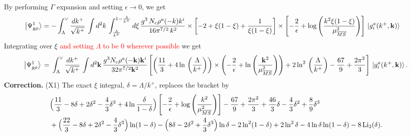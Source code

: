 \documentclass[10pt]{article}
\numberwithin{equation}{section}
\begin{document}
By performing $\Gamma$ expansion and setting $\epsilon \rightarrow 0$, we get
\begin{align}
     \left|\Psi_{g\rho}^{1}\right\rangle & = - \int_{\Lambda}^{\vee} \frac{dk^{+}}{\sqrt{k^{+}}} \,\int d^{2}k\, \int_{\frac{\Lambda}{k^{+}}}^{1-\frac{\Lambda}{k^{+}}} d\xi\, \frac{g^{3}\,N_{c}\rho^{a}(-k) k^{i}}{16\pi^{7/2}\,k^{2}}\times \left[-2+\xi(1-\xi)+\frac{1}{\xi(1-\xi)}\right]\times \left[-\frac{2}{\epsilon}+\log{\left(\frac{k^{2}\xi(1-\xi)}{\mu^{2}_{\overline{MS}}}\right)}\right]\, \ket{g^{a}_{i}(k^{+},\mathbf{k})}
\end{align}
Integrating over $\xi$ \textcolor{red}{and setting $\Lambda$ to be $0$ wherever possible} we get\\
\begin{align}\label{gtwoloop1}
\left|\Psi_{g\rho}^{1}\right\rangle\,=\,\int_{\Lambda}^{\vee}\frac{dk^{+}}{\sqrt{k^{+}}}\,\int d^{2}\mathbf{k}\,\frac{g^{3}N_{c}\rho^{a}(-\mathbf{k})\mathbf{k}^{i}}{32\pi^{7/2}\mathbf{k}^{2}}
\left[\left(\frac{11}{3}+4\ln\,\left(\frac{\Lambda}{k^{+}}\right)\right)\times\left(-\frac{2}{\epsilon}+\ln\left(\frac{\mathbf{k}^{2}}{\mu_{\overline{MS}}^{2}}\right)\right)+2\ln^{2}\,\left(\frac{\Lambda}{k^{+}}\right)-\frac{67}{9}+\frac{2\pi^{2}}{3}\right]\, \ket{g^{a}_{i}(k^{+},\mathbf{k})}.
\end{align}
{\color{blue}\noindent\textbf{Correction.} (X1) The exact $\xi$ integral, $\delta=\Lambda/k^+$, replaces the bracket by
\begin{align}
&\Big(\frac{11}{3}-8\delta+2\delta^2-\frac43\delta^3+4\ln\frac{\delta}{1-\delta}\Big)\left[-\frac{2}{\epsilon}+\log{\left(\frac{k^{2}}{\mu^{2}_{\overline{MS}}}\right)}\right]-\frac{67}{9}+\frac{2\pi^2}{3}+\frac{46}{3}\delta-\frac43\delta^2+\frac89\delta^3\notag\\
&+\Big(\frac{22}{3}-8\delta+2\delta^2-\frac43\delta^3\Big)\ln(1-\delta)-\Big(8\delta-2\delta^2+\frac43\delta^3\Big)\ln\delta-2\ln^2(1-\delta)+2\ln^2\delta-4\ln\delta\ln(1-\delta)-8\,{\rm Li}_2(\delta).\notag
\end{align}}
\end{document}
